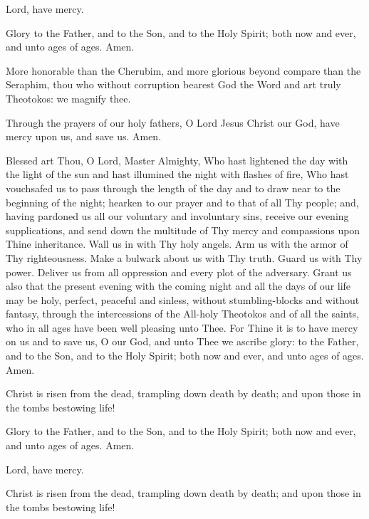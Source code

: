 Lord, have mercy. 

Glory to the Father, and to the Son, and to the Holy Spirit; both now and ever, and unto ages of ages. Amen.

More honorable than the Cherubim, and more glorious beyond compare than the Seraphim, thou who without corruption bearest God the Word and art truly Theotokos: we magnify thee.

Through the prayers of our holy fathers, O Lord Jesus Christ our God, have mercy upon us, and save us. Amen.


Blessed art Thou, O Lord, Master Almighty, Who hast lightened the day with the light of the sun and hast illumined the night with flashes of fire, Who hast vouchsafed us to pass through the length of the day and to draw near to the beginning of the night; hearken to our prayer and to that of all Thy people; and, having pardoned us all our voluntary and involuntary sins, receive our evening supplications, and send down the multitude of Thy mercy and compassions upon Thine inheritance. Wall us in with Thy holy angels. Arm us with the armor of Thy righteousness. Make a bulwark about us with Thy truth. Guard us with Thy power. Deliver us from all oppression and every plot of the adversary. Grant us also that the present evening with the coming night and all the days of our life may be holy, perfect, peaceful and sinless, without stumbling-blocks and without fantasy, through the intercessions of the All-holy Theotokos and of all the saints, who in all ages have been well pleasing unto Thee. For Thine it is to have mercy on us and to save us, O our God, and unto Thee we ascribe glory: to the Father, and to the Son, and to the Holy Spirit; both now and ever, and unto ages of ages. Amen.

Christ is risen from the dead, trampling down death by death; and upon those in the tombs bestowing life! 

Glory to the Father, and to the Son, and to the Holy Spirit; both now and ever, and unto ages of ages. Amen.

Lord, have mercy. 

Christ is risen from the dead, trampling down death by death; and upon those in the tombs bestowing life!

\cleardoublepage
